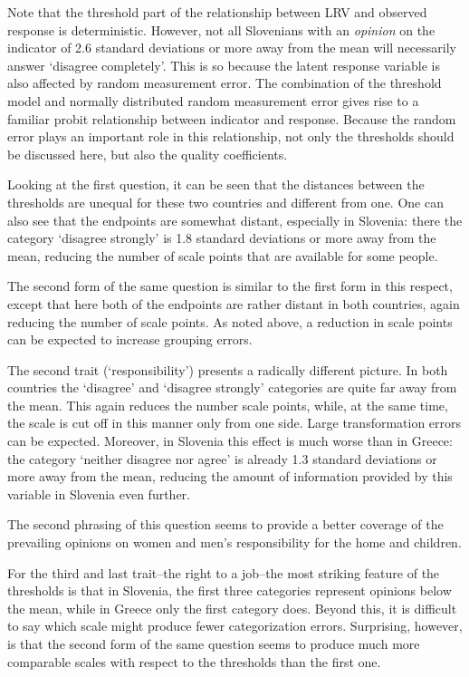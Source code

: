 \documentclass[a4paper,12pt]{article}
\begin{document}
Note that the threshold part of the relationship between LRV and observed response is deterministic. However, not all Slovenians with an \emph{opinion} on the indicator of 2.6 standard deviations or more away from the mean will necessarily answer `disagree completely'.  This is so because the latent response variable is also affected by random measurement error. The combination of the threshold model and normally distributed random measurement error gives rise to a familiar probit relationship between indicator and response. Because the random error plays an important role in this relationship, not only the thresholds should be discussed here, but also the quality coefficients. 

Looking at the first question, it can be seen that the distances between the thresholds are unequal for these two countries and different from one. One can also see that the endpoints are somewhat distant, especially in Slovenia: there the category `disagree strongly' is 1.8 standard deviations or more away from the mean, reducing the number of scale points that are available for some people. 

The second form of the same question is similar to the first form in this respect, except that here both of the endpoints are rather distant in both countries, again reducing the number of scale points. As noted above, a reduction in scale points can be expected to increase grouping errors.

The second trait (`responsibility') presents a radically different picture. In both countries the `disagree' and `disagree strongly' categories are quite far away from the mean. This again reduces the number scale points, while, at the same time, the scale is cut off in this manner only from one side. Large transformation errors can be expected. Moreover, in Slovenia this effect is much worse than in Greece: the category `neither disagree nor agree' is already 1.3 standard deviations or more away from the mean,  reducing the amount of information provided by this variable in Slovenia even further.

The second phrasing of this question seems to provide a better coverage of the prevailing opinions on women and men's responsibility for the home and children.

For the third and last trait--the right to a job--the most striking feature of the thresholds is that in Slovenia, the first three categories represent opinions below the mean, while in Greece only the first category does. Beyond this, it is difficult to say which scale might produce fewer categorization errors. Surprising, however, is that the second form of the same question seems to produce much more comparable scales with respect to the thresholds than the first one.
\end{document}
